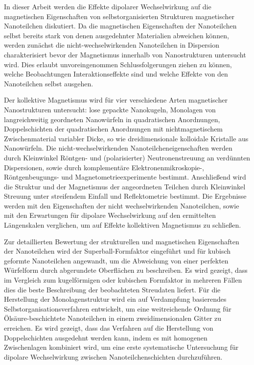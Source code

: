 \documentclass[\main/dresen_thesis.tex]{subfiles}
\begin{document}
  In dieser Arbeit werden die Effekte dipolarer Wechselwirkung auf die magnetischen Eigenschaften von selbstorganisierten Strukturen magnetischer Nanoteilchen diskutiert.
  Da die magnetischen Eigenschaften der Nanoteilchen selbst bereits stark von denen ausgedehnter Materialien abweichen können, werden zunächst die nicht-wechselwirkenden Nanoteilchen in Dispersion charakterisiert bevor der Magnetismus innerhalb von Nanostrukturen untersucht wird.
  Dies erlaubt unvoreingenommen Schlussfolgerungen ziehen zu können, welche Beobachtungen Interaktionseffekte sind und welche Effekte von den Nanoteilchen selbst ausgehen.

  Der kollektive Magnetismus wird für vier verschiedene Arten magnetischer Nanostrukturen untersucht: lose gepackte Nanokugeln, Monolagen von langreichweitig geordneten Nanowürfeln in quadratischen Anordnungen, Doppelschichten der quadratischen Anordnungen mit nichtmagnetischem Zwischenmaterial variabler Dicke, so wie dreidimensionale kolloidale Kristalle aus Nanowürfeln.
  Die nicht-wechselwirkenden Nanoteilcheneigenschaften werden durch Kleinwinkel Röntgen- und (polarisierter) Neutronenstreuung an verdünnten Dispersionen, sowie durch komplementäre Elektronenmikroskopie-, Röntgenbeugungs- und Magnetometrieexperimente bestimmt.
  Anschließend wird die Struktur und der Magnetismus der angeordneten Teilchen durch Kleinwinkel Streuung unter streifendem Einfall und Reflektometrie bestimmt.
  Die Ergebnisse werden mit den Eigenschaften der nicht wechselwirkenden Nanoteilchen, sowie mit den Erwartungen für dipolare Wechselwirkung auf den ermittelten Längenskalen verglichen, um auf Effekte kollektiven Magnetismus zu schließen.

  Zur detaillierten Bewertung der strukturellen und magnetischen Eigenschaften der Nanoteilchen wird der Superball-Formfaktor eingeführt und für kubisch geformte Nanoteilchen angewandt, um die Abweichung von einer perfekten Würfelform durch abgerundete Oberflächen zu beschreiben.
  Es wird gezeigt, dass im Vergleich zum kugelförmigen oder kubischen Formfaktor in mehreren Fällen dies die beste Beschreibung der beobachteten Streudaten liefert.
  Für die Herstellung der Monolagenstruktur wird ein auf Verdampfung basierendes Selbstorganisationsverfahren entwickelt, um eine weitreichende Ordnung für Ölsäure-beschichtete Nanoteilchen in einem zweidimensionalen Gitter zu erreichen.
  Es wird gezeigt, dass das Verfahren auf die Herstellung von Doppelschichten ausgedehnt werden kann, indem es mit homogenen Zwischenlagen kombiniert wird, um eine erste systematische Untersuchung für dipolare Wechselwirkung zwischen Nanoteilchenschichten durchzuführen.
\end{document}
